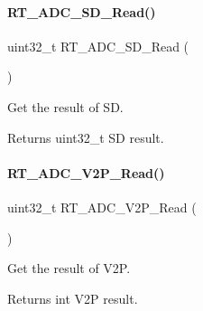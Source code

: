 \paragraph{\texorpdfstring{R\+T\+\_\+\+A\+D\+C\+\_\+\+S\+D\+\_\+\+Read()}{RT\_ADC\_SD\_Read()}}
{\footnotesize\ttfamily uint32\+\_\+t R\+T\+\_\+\+A\+D\+C\+\_\+\+S\+D\+\_\+\+Read (\begin{DoxyParamCaption}{ }\end{DoxyParamCaption})}



Get the result of SD. 

\begin{DoxyReturn}{Returns}
uint32\+\_\+t SD result. 
\end{DoxyReturn}
\mbox{\label{a00002_aeb7d0cb0a7849fc5736dae01fe607910}} 
\paragraph{\texorpdfstring{R\+T\+\_\+\+A\+D\+C\+\_\+\+V2\+P\+\_\+\+Read()}{RT\_ADC\_V2P\_Read()}}
{\footnotesize\ttfamily uint32\+\_\+t R\+T\+\_\+\+A\+D\+C\+\_\+\+V2\+P\+\_\+\+Read (\begin{DoxyParamCaption}{ }\end{DoxyParamCaption})}



Get the result of V2P. 

\begin{DoxyReturn}{Returns}
int V2P result. 
\end{DoxyReturn}
